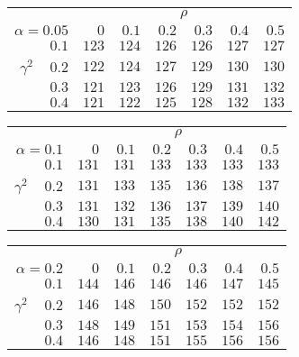 \begin{tabular}{r|rrrrrr}
\hline\hline
 &\multicolumn{6}{c}{$\rho$} \\ 
 $\alpha = 0.05$ & $0$ & $0.1$ & $0.2$ & $0.3$ & $0.4$ & $0.5$ \\ 
 \hline$0.1$ & $123$ & $124$ & $126$ & $126$ & $127$ & $127$\\ 
$\gamma^2\;\;\;$ $0.2$ & $122$ & $124$ & $127$ & $129$ & $130$ & $130$\\ 
$0.3$ & $121$ & $123$ & $126$ & $129$ & $131$ & $132$\\ 
$0.4$ & $121$ & $122$ & $125$ & $128$ & $132$ & $133$\\ 
 \hline 
 \end{tabular}
 
 \vspace{2em} 
 
\begin{tabular}{r|rrrrrr}
\hline\hline
 &\multicolumn{6}{c}{$\rho$} \\ 
 $\alpha = 0.1$ & $0$ & $0.1$ & $0.2$ & $0.3$ & $0.4$ & $0.5$ \\ 
 \hline$0.1$ & $131$ & $131$ & $133$ & $133$ & $133$ & $133$\\ 
$\gamma^2\;\;\;$ $0.2$ & $131$ & $133$ & $135$ & $136$ & $138$ & $137$\\ 
$0.3$ & $131$ & $132$ & $136$ & $137$ & $139$ & $140$\\ 
$0.4$ & $130$ & $131$ & $135$ & $138$ & $140$ & $142$\\ 
 \hline 
 \end{tabular}
 
 \vspace{2em} 
 
\begin{tabular}{r|rrrrrr}
\hline\hline
 &\multicolumn{6}{c}{$\rho$} \\ 
 $\alpha = 0.2$ & $0$ & $0.1$ & $0.2$ & $0.3$ & $0.4$ & $0.5$ \\ 
 \hline$0.1$ & $144$ & $146$ & $146$ & $146$ & $147$ & $145$\\ 
$\gamma^2\;\;\;$ $0.2$ & $146$ & $148$ & $150$ & $152$ & $152$ & $152$\\ 
$0.3$ & $148$ & $149$ & $151$ & $153$ & $154$ & $156$\\ 
$0.4$ & $146$ & $148$ & $151$ & $155$ & $156$ & $156$\\ 
 \hline 
 \end{tabular}